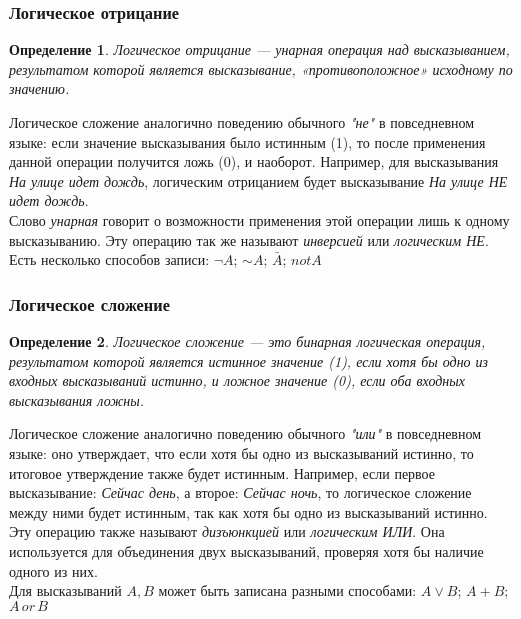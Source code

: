 \documentclass[12pt]{article}
\newtheorem{definition}{Определение}[section]
\theoremstyle{problem_style}
\begin{document}
\subsubsection{Логическое отрицание}
\begin{definition}
Логическое отрицание — унарная операция над высказыванием, результатом которой является высказывание, «противоположное» исходному по значению.
\end{definition}
Логическое сложение аналогично поведению обычного \textit{"не"} в повседневном языке: если значение высказывания было истинным (1), то после применения данной операции получится ложь (0), и наоборот. Например, для высказывания \textit{На улице идет дождь}, логическим отрицанием будет высказывание \textit{На улице НЕ идет дождь}.\\
Слово \textit{унарная} говорит о возможности применения этой операции лишь к одному высказыванию.  Эту операцию так же называют \textit{инверсией} или \textit{логическим НЕ}.\\
Есть несколько способов записи: \( \neg A \); \( \sim A \); \( \bar{A} \); \(not A\)

\subsubsection{Логическое сложение}
\begin{definition}
Логическое сложение — это бинарная логическая операция, результатом которой является истинное значение (1), если хотя бы одно из входных высказываний истинно, и ложное значение (0), если оба входных высказывания ложны.
\end{definition}
Логическое сложение аналогично поведению обычного \textit{"или"} в повседневном языке: оно утверждает, что если хотя бы одно из высказываний истинно, то итоговое утверждение также будет истинным. Например, если первое высказывание: \textit{Сейчас день}, а второе: \textit{Сейчас ночь}, то логическое сложение между ними будет истинным, так как хотя бы одно из высказываний истинно.\\
Эту операцию также называют \textit{дизъюнкцией} или \textit{логическим ИЛИ}. Она используется для объединения двух высказываний, проверяя хотя бы наличие одного из них.\\
Для высказываний $A, B$ может быть записана разными способами: \(A \lor B\); \( A + B \); \(A\,or\,B \)
\end{document}
